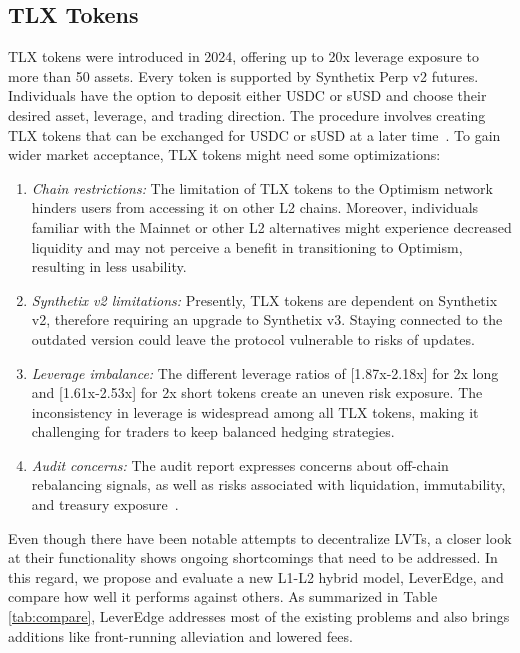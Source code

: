 \subsection{TLX Tokens}\label{subsec:tlx}
TLX tokens were introduced in 2024, offering up to 20x leverage exposure to more than 50 assets. Every token is supported by Synthetix Perp v2 futures. Individuals have the option to deposit either USDC or sUSD and choose their desired asset, leverage, and trading direction. The procedure involves creating TLX tokens that can be exchanged for USDC or sUSD at a later time~\cite{TLX_Doc1,TLX_Doc2}. To gain wider market acceptance, TLX tokens might need some optimizations:
\begin{enumerate}[label={\ref{subsec:tlx}.\arabic*},leftmargin=*]
	\item \textit{Chain restrictions:} The limitation of TLX tokens to the Optimism network hinders users from accessing it on other L2 chains. Moreover, individuals familiar with the Mainnet or other L2 alternatives might experience decreased liquidity and may not perceive a benefit in transitioning to Optimism, resulting in less usability.
	
	\item \textit{Synthetix v2 limitations:} Presently, TLX tokens are dependent on Synthetix v2, therefore requiring an upgrade to Synthetix v3. Staying connected to the outdated version could leave the protocol vulnerable to risks of updates.
	
	
	\item \textit{Leverage imbalance:} The different leverage ratios of [1.87x-2.18x] for 2x long and [1.61x-2.53x] for 2x short tokens create an uneven risk exposure. The inconsistency in leverage is widespread among all TLX tokens, making it challenging for traders to keep balanced hedging strategies.
	
	\item \textit{Audit concerns:} The audit report expresses concerns about off-chain rebalancing signals, as well as risks associated with liquidation, immutability, and treasury exposure~\cite{TLX_Audit}.
\end{enumerate}

Even though there have been notable attempts to decentralize LVTs, a closer look at their functionality shows ongoing shortcomings that need to be addressed. In this regard, we propose and evaluate a new L1-L2 hybrid model, LeverEdge, and compare how well it performs against others. As summarized in Table \ref{tab:compare}, LeverEdge addresses most of the existing problems and also brings additions like front-running alleviation and lowered fees.

